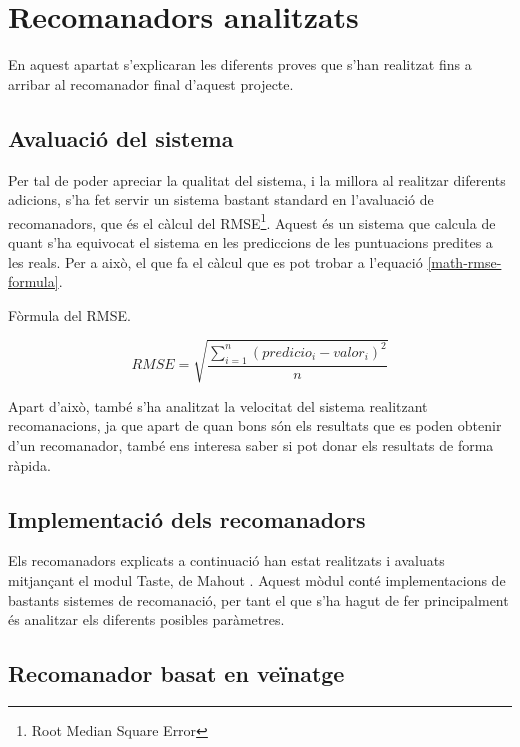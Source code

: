 \chapter{Recomanadors analitzats}

En aquest apartat s'explicaran les diferents proves que s'han realitzat fins a arribar al recomanador final d'aquest projecte.

\section{Avaluació del sistema}

Per tal de poder apreciar la qualitat del sistema, i la millora al realitzar diferents adicions, s'ha fet servir un sistema bastant standard en l'avaluació de recomanadors, que és el càlcul del RMSE\footnote{Root Median Square Error}. Aquest és un sistema que calcula de quant s'ha equivocat el sistema en les prediccions de les puntuacions predites a les reals. Per a això, el que fa el càlcul que es pot trobar a l'equació \ref{math-rmse-formula}.

\begin{mycapequ}[h]
\caption{Fòrmula del RMSE.}
\label{math-rmse-formula}
\begin{equation}
RMSE=\sqrt{\frac{\sum_{i=1}^{n}{(predicio_i - valor_i)}^2}{n}}
\end{equation}
\end{mycapequ}

Apart d'això, també s'ha analitzat la velocitat del sistema realitzant recomanacions, ja que apart de quan bons són els resultats que es poden obtenir d'un recomanador, també ens interesa saber si pot donar els resultats de forma ràpida.

\section{Implementació dels recomanadors}

Els recomanadors explicats a continuació han estat realitzats i avaluats mitjançant el modul Taste, de Mahout \cite{Apache-Mahout}. Aquest mòdul conté implementacions de bastants sistemes de recomanació, per tant el que s'ha hagut de fer principalment és analitzar els diferents posibles paràmetres.


\section{Recomanador basat en veïnatge}

